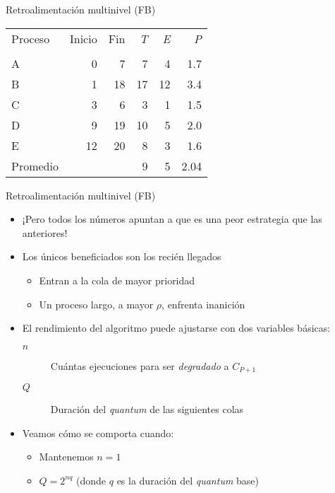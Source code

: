 \documentclass[presentation]{beamer}
\begin{document}
\begin{frame}[label={sec:orgf61b5f5}]{Retroalimentación multinivel (FB)}
\begin{center}
\begin{tabular}{lrrrrr}
Proceso & Inicio & Fin & \emph{T} & \emph{E} & \emph{P}\\
 &  &  &  &  & \\
\hline
A & 0 & 7 & 7 & 4 & 1.7\\
B & 1 & 18 & 17 & 12 & 3.4\\
C & 3 & 6 & 3 & 1 & 1.5\\
D & 9 & 19 & 10 & 5 & 2.0\\
E & 12 & 20 & 8 & 3 & 1.6\\
\hline
Promedio &  &  & 9 & 5 & 2.04\\
\end{tabular}
\end{center}
\end{frame}

\begin{frame}[label={sec:orga8da4b0}]{Retroalimentación multinivel (FB)}
\begin{itemize}
\item ¡Pero todos los números apuntan a que es una peor estrategia que
las anteriores!
\item Los únicos beneficiados son los recién llegados
\begin{itemize}
\item Entran a la cola de mayor prioridad
\item Un proceso largo, a mayor \(\rho\), enfrenta inanición
\end{itemize}
\item El rendimiento del algoritmo puede ajustarse con dos variables
básicas:
\begin{description}
\item[{\(n\)}] Cuántas ejecuciones para ser \emph{degradado} a \(C_{P+1}\)
\item[{\(Q\)}] Duración del \emph{quantum} de las siguientes colas
\end{description}
\item Veamos cómo se comporta cuando:
\begin{itemize}
\item Mantenemos \(n = 1\)
\item \(Q = 2^{nq}\) (donde \(q\) es la duración del \emph{quantum} base)
\end{itemize}
\end{itemize}
\end{frame}
\end{document}

